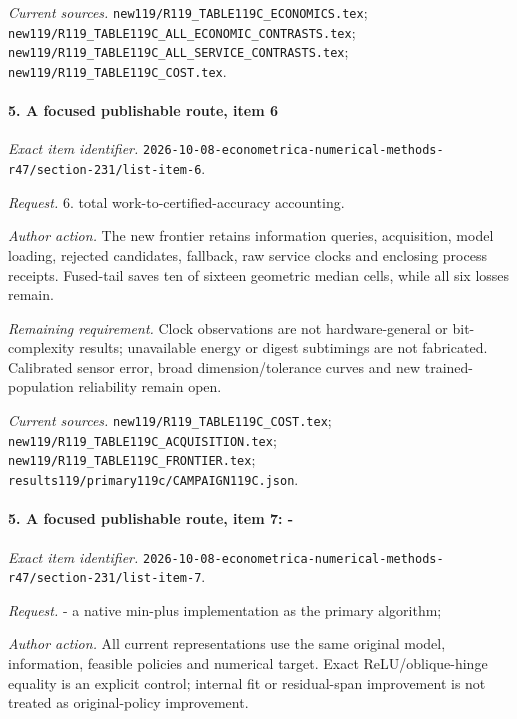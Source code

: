 \par\emph{Current sources.} \nolinkurl{new119/R119_TABLE119C_ECONOMICS.tex}; \nolinkurl{new119/R119_TABLE119C_ALL_ECONOMIC_CONTRASTS.tex}; \nolinkurl{new119/R119_TABLE119C_ALL_SERVICE_CONTRASTS.tex}; \nolinkurl{new119/R119_TABLE119C_COST.tex}.

\paragraph{5. A focused publishable route, item 6}

\emph{Exact item identifier.} \nolinkurl{2026-10-08-econometrica-numerical-methods-r47/section-231/list-item-6}.

\par\emph{Request.} 6. total work-to-certified-accuracy accounting.

\par\emph{Author action.} The new frontier retains information queries, acquisition, model loading, rejected candidates, fallback, raw service clocks and enclosing process receipts. Fused-tail saves ten of sixteen geometric median cells, while all six losses remain.

\par\emph{Remaining requirement.} Clock observations are not hardware-general or bit-complexity results; unavailable energy or digest subtimings are not fabricated. Calibrated sensor error, broad dimension/\allowbreak{}tolerance curves and new trained-population reliability remain open.

\par\emph{Current sources.} \nolinkurl{new119/R119_TABLE119C_COST.tex}; \nolinkurl{new119/R119_TABLE119C_ACQUISITION.tex}; \nolinkurl{new119/R119_TABLE119C_FRONTIER.tex}; \nolinkurl{results119/primary119c/CAMPAIGN119C.json}.

\paragraph{5. A focused publishable route, item 7: -}

\emph{Exact item identifier.} \nolinkurl{2026-10-08-econometrica-numerical-methods-r47/section-231/list-item-7}.

\par\emph{Request.} - a native min-plus implementation as the primary algorithm;

\par\emph{Author action.} All current representations use the same original model, information, feasible policies and numerical target. Exact ReLU/\allowbreak{}oblique-hinge equality is an explicit control; internal fit or residual-span improvement is not treated as original-policy improvement.

